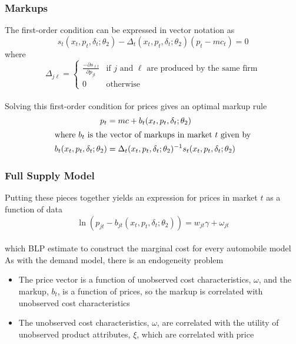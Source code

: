 \documentclass{beamer}
\begin{document}
\begin{frame}\frametitle{Markups}
    The first-order condition can be expressed in vector notation as
    $$s_t(x_t, p_t, \delta_t; \theta_2) - \Delta_t(x_t, p_t, \delta_t; \theta_2)(p_t - mc_t) = 0$$
    where
    $$\Delta_{j \ell} = \begin{cases}
        \frac{- \partial s_{\ell t}}{\partial p_{jt}} & \text{if $j$ and $\ell$ are produced by the same firm} \\
        0 & \text{otherwise}
    \end{cases}$$ \\
    \vspace{2ex}
    Solving this first-order condition for prices gives an optimal markup rule
    \begin{align*}
        p_t &= mc + b_t(x_t, p_t, \delta_t; \theta_2) \\
        \intertext{where $b_t$ is the vector of markups in market $t$ given by}
        b_t(x_t, p_t, \delta_t; \theta_2) &= \Delta_t(x_t, p_t, \delta_t; \theta_2)^{-1} s_t(x_t, p_t, \delta_t; \theta_2)
    \end{align*}
\end{frame}

\begin{frame}\frametitle{Full Supply Model}
    Putting these pieces together yields an expression for prices in market $t$ as a function of data
    $$\ln(p_{jt} - b_{jt}(x_t, p_t, \delta_t; \theta_2)) = w_{jt} \gamma + \omega_{jt}$$ \\
    which BLP estimate to construct the marginal cost for every automobile model \\
    \vspace{2ex}
    As with the demand model, there is an endogeneity problem
    \begin{itemize}
        \item The price vector is a function of unobserved cost characteristics, $\omega$, and the markup, $b_t$, is a function of prices, so the markup is correlated with unobserved cost characteristics
        \item The unobserved cost characteristics, $\omega$, are correlated with the utility of unobserved product attributes, $\xi$, which are correlated with price
    \end{itemize}
\end{frame}
\end{document}
